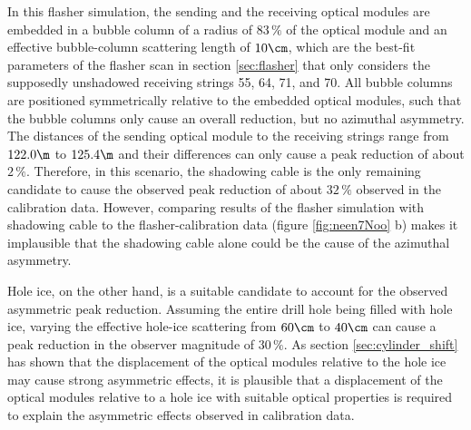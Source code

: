 In this flasher simulation, the sending and the receiving optical modules are embedded in a bubble column of a radius of $83\,\%$ of the optical module and an effective bubble-column scattering length of $10\cm$, which are the best-fit parameters of the flasher scan in section \ref{sec:flasher} that only considers the supposedly unshadowed receiving strings 55, 64, 71, and 70. All bubble columns are positioned symmetrically relative to the embedded optical modules, such that the bubble columns only cause an overall reduction, but no azimuthal asymmetry. The distances of the sending optical module to the receiving strings range from $122.0\m$ to $125.4\m$ and their differences can only cause a peak reduction of about $2\,\%$.
Therefore, in this scenario, the shadowing cable is the only remaining candidate to cause the observed peak reduction of about $32\,\%$ observed in the calibration data.
However, comparing results of the flasher simulation with shadowing cable to the flasher-calibration data (figure \ref{fig:neen7Noo} b) makes it implausible that the shadowing cable alone could be the cause of the azimuthal asymmetry.

Hole ice, on the other hand, is a suitable candidate to account for the observed asymmetric peak reduction. Assuming the entire drill hole being filled with hole ice, varying the effective hole-ice scattering from $60\cm$ to $40\cm$ can cause a peak reduction in the observer magnitude of $30\,\%$. As section \ref{sec:cylinder_shift} has shown that the displacement of the optical modules relative to the hole ice may cause strong asymmetric effects, it is plausible that a displacement of the optical modules relative to a hole ice with suitable optical properties is required to explain the asymmetric effects observed in calibration data.
